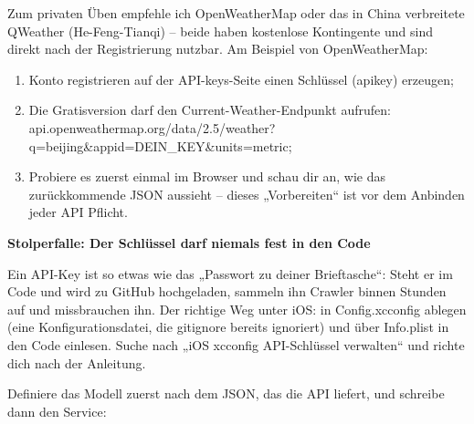


Zum privaten Üben empfehle ich OpenWeatherMap oder das in China verbreitete QWeather (He-Feng-Tianqi) – beide haben kostenlose Kontingente und sind direkt nach der Registrierung nutzbar. Am Beispiel von OpenWeatherMap:

\begin{enumerate}
  \item Konto registrieren auf der API-keys-Seite einen Schlüssel (apikey) erzeugen;
  \item Die Gratisversion darf den Current-Weather-Endpunkt aufrufen: api.openweathermap.org/data/2.5/weather? q=beijing\&appid=DEIN\_KEY\&units=metric;
  \item Probiere es zuerst einmal im Browser und schau dir an, wie das zurückkommende JSON aussieht – dieses „Vorbereiten“ ist vor dem Anbinden jeder API Pflicht.
\end{enumerate}

\textbf{Stolperfalle: Der Schlüssel darf niemals fest in den Code}\par

Ein API-Key ist so etwas wie das „Passwort zu deiner Brieftasche“: Steht er im Code und wird zu GitHub hochgeladen, sammeln ihn Crawler binnen Stunden auf und missbrauchen ihn. Der richtige Weg unter iOS: in Config.xcconfig ablegen (eine Konfigurationsdatei, die gitignore bereits ignoriert) und über Info.plist in den Code einlesen. Suche nach „iOS xcconfig API-Schlüssel verwalten“ und richte dich nach der Anleitung.


Definiere das Modell zuerst nach dem JSON, das die API liefert, und schreibe dann den Service:

